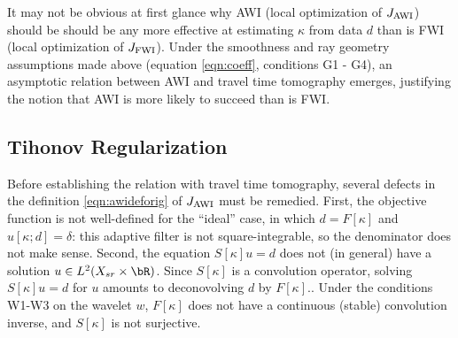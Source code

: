 It may not be obvious at first glance why AWI (local optimization of
$J_{\rm AWI}$) should be should be any more effective at estimating
$\kappa$ from data $d$ than is FWI (local
optimization of $J_{\rm FWI}$). Under the smoothness and ray geometry assumptions made above (equation
\ref{eqn:coeff}, conditions G1 - G4), an asymptotic relation
between AWI and travel time tomography emerges, justifying the notion
that AWI is more likely to succeed than is FWI.

\subsection{Tihonov Regularization}
Before establishing the relation with travel time tomography, several
defects in the definition \ref{eqn:awideforig} of $J_{\rm AWI}$ must be
remedied. First, the objective function is not well-defined for the
``ideal'' case, in which $d = F[\kappa]$ and $u[\kappa;d]=\delta$:
this adaptive filter is not square-integrable, so the denominator does
not make sense. Second, the equation $S[\kappa]u=d$ does not (in
general) have a solution $u \in L^2(X_{sr} \times \bR)$. Since
$S[\kappa]$ is a convolution operator, solving $S[\kappa]u=d$ for $u$
amounts to deconovolving $d$ by $F[\kappa]$..  Under the conditions
W1-W3 on the wavelet $w$, $F[\kappa]$ does not have a continuous
(stable) convolution inverse, and $S[\kappa]$ is not surjective.

